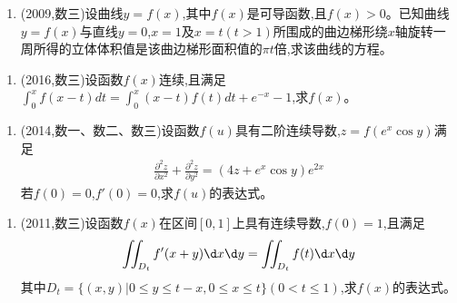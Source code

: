 \documentclass[12pt, a4paper, oneside, UTF8]{ctexbook}
\begin{document}
\begin{enumerate}[label=\arabic*.,start=19]
    \item (2009,数三)设曲线$y=f(x)$,其中$f(x)$是可导函数,且$f(x)>0$。已知曲线$y=f(x)$与直线$y=0$,$x=1$及$x=t(t>1)$所围成的曲边梯形绕$x$轴旋转一周所得的立体体积值是该曲边梯形面积值的$\pi t$倍,求该曲线的方程。
    
    \begin{solution}
    \newpage
    \end{solution}
\end{enumerate}

\begin{enumerate}[label=\arabic*.,start=20]
    \item (2016,数三)设函数$f(x)$连续,且满足$\int_0^x f(x-t)dt=\int_0^x(x-t)f(t)dt+e^{-x}-1$,求$f(x)$。
    
    \begin{solution}
    \newpage
    \end{solution}
\end{enumerate}

\begin{enumerate}[label=\arabic*.,start=21]
    \item (2014,数一、数二、数三)设函数$f(u)$具有二阶连续导数,$z=f(e^x\cos y)$满足
    \begin{align*}
        \frac{\partial^2 z}{\partial x^2}+\frac{\partial^2 z}{\partial y^2}=(4z+e^x\cos y)e^{2x}
    \end{align*}
    若$f(0)=0$,$f'(0)=0$,求$f(u)$的表达式。
    
    \begin{solution}
    \newpage
    \end{solution}
\end{enumerate}

\begin{enumerate}[label=\arabic*.,start=22]
    \item (2011,数三)设函数$f(x)$在区间$[0,1]$上具有连续导数,$f(0)=1$,且满足
    \begin{align*}
        \iint_{D_t} f'(x+y)\d x\d y=\iint_{D_t} f(t)\d x\d y
    \end{align*}
    其中$D_t=\{(x,y)|0\leq y\leq t-x,0\leq x\leq t\}(0<t\leq1)$,求$f(x)$的表达式。
    
    \begin{solution}
    \newpage
    \end{solution}
\end{enumerate}

\ifx\allfiles\undefined
\end{document}

